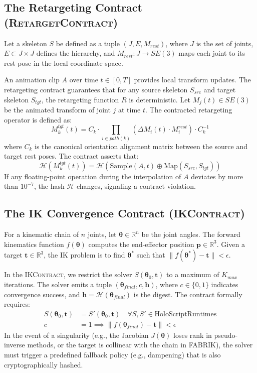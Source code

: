 \documentclass[sigconf,nonacm]{acmart}
\newcommand{\retargetcontract}{\textsc{RetargetContract}}
\newcommand{\ikcontract}{\textsc{IKContract}}
\newcommand{\hashfn}{\mathcal{H}}
\begin{document}
\subsection{The Retargeting Contract (\retargetcontract{})} Let a skeleton $S$
be defined as a tuple $(J, E, M_{rest})$, where $J$ is the set of joints, $E
\subset J \times J$ defines the hierarchy, and $M_{rest} : J \to SE(3)$ maps
each joint to its rest pose in the local coordinate space.

An animation clip $A$ over time $t \in [0, T]$ provides local transform updates.
The retargeting contract guarantees that for any source skeleton $S_{src}$ and
target skeleton $S_{tgt}$, the retargeting function $R$ is deterministic. Let
$M_j(t) \in SE(3)$ be the animated transform of joint $j$ at time $t$. The
contracted retargeting operator is defined as: \begin{equation}     M^{tgt}_k(t)
= C_{k} \cdot \prod_{i \in path(k)} \left( \Delta M_i(t) \cdot M^{rest}_i
\right) \cdot C_{k}^{-1} \end{equation} where $C_k$ is the canonical orientation
alignment matrix between the source and target rest poses. The contract asserts
that: \begin{equation}     \hashfn\left( M^{tgt}_k(t) \right) = \hashfn\left(
\text{Sample}(A, t) \oplus \text{Map}(S_{src}, S_{tgt}) \right) \end{equation}
If any floating-point operation during the interpolation of $A$ deviates by more
than $10^{-7}$, the hash $\hashfn$ changes, signaling a contract violation.

\subsection{The IK Convergence Contract (\ikcontract{})} For a kinematic chain
of $n$ joints, let $\mathbf{\theta} \in \mathbb{R}^n$ be the joint angles. The
forward kinematics function $f(\mathbf{\theta})$ computes the end-effector
position $\mathbf{p} \in \mathbb{R}^3$. Given a target $\mathbf{t} \in
\mathbb{R}^3$, the IK problem is to find $\mathbf{\theta}^*$ such that $\|
f(\mathbf{\theta}^*) - \mathbf{t} \| < \epsilon$.

In the \ikcontract{}, we restrict the solver $S(\mathbf{\theta}_0, \mathbf{t})$
to a maximum of $K_{max}$ iterations. The solver emits a tuple
$(\mathbf{\theta}_{final}, c, \mathbf{h})$, where $c \in \{0, 1\}$ indicates
convergence success, and $\mathbf{h} = \hashfn(\mathbf{\theta}_{final})$ is the
digest. The contract formally requires: \begin{align}     S(\mathbf{\theta}_0,
\mathbf{t}) &= S'(\mathbf{\theta}_0, \mathbf{t}) \quad \forall S, S' \in
\text{HoloScriptRuntimes} \\     c &= 1 \implies \| f(\mathbf{\theta}_{final}) -
\mathbf{t} \| < \epsilon \end{align} In the event of a singularity (e.g., the
Jacobian $J(\mathbf{\theta})$ loses rank in pseudo-inverse methods, or the
target is collinear with the chain in FABRIK), the solver must trigger a
predefined fallback policy (e.g., dampening) that is also cryptographically
hashed.
\end{document}
